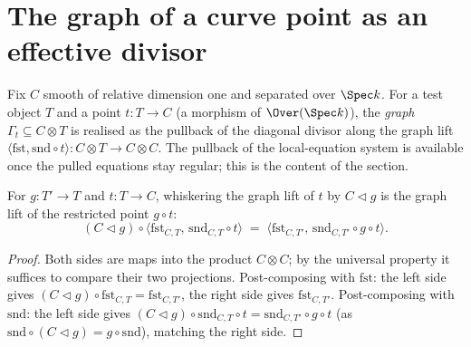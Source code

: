 \section{The graph of a curve point as an effective divisor}

Fix \(C\) smooth of relative dimension one and separated over \(\Spec k\). For a test object \(T\)
and a point \(t \colon T \to C\) (a morphism of \(\Over(\Spec k)\)), the \emph{graph}
\(\Gamma_t \subseteq C \otimes T\) is realised as the pullback of the diagonal divisor along the
graph lift \(\langle \mathrm{fst}, \mathrm{snd} \circ t\rangle \colon C \otimes T \to C \otimes C\).
The pullback of the local-equation system is available once the pulled equations stay regular; this
is the content of the section.

\begin{lemma}
  \label{lem:whiskerLeft_comp_graphLift}
  \leanok
  For \(g \colon T' \to T\) and \(t \colon T \to C\), whiskering the graph lift of \(t\) by
  \(C \lhd g\) is the graph lift of the restricted point \(g \circ t\):
  \[
    (C \lhd g) \circ \langle \mathrm{fst}_{C,T},\, \mathrm{snd}_{C,T} \circ t\rangle
      \;=\; \langle \mathrm{fst}_{C,T'},\, \mathrm{snd}_{C,T'} \circ g \circ t\rangle .
  \]
\end{lemma}
\begin{proof}
  \leanok
  Both sides are maps into the product \(C \otimes C\); by the universal property it suffices to
  compare their two projections. Post-composing with \(\mathrm{fst}\): the left side gives \((C
  \lhd g) \circ \mathrm{fst}_{C,T} = \mathrm{fst}_{C,T'}\), the right side gives
  \(\mathrm{fst}_{C,T'}\). Post-composing with \(\mathrm{snd}\): the left side gives \((C \lhd g)
  \circ \mathrm{snd}_{C,T} \circ t = \mathrm{snd}_{C,T'} \circ g \circ t\) (as \(\mathrm{snd} \circ
  (C \lhd g) = g \circ \mathrm{snd}\)), matching the right side.
\end{proof}

